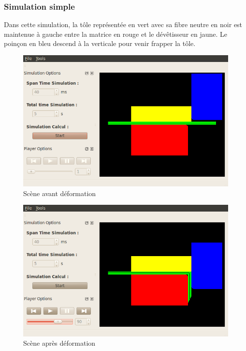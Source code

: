 \documentclass[a4paper, 11pt]{article}
\begin{document}
\subsubsection{Simulation simple}
Dans cette simulation, la tôle représentée en vert avec sa fibre neutre en noir est maintenue à gauche entre la matrice en rouge et le dévêtisseur en jaune.
Le poinçon en bleu descend à la verticale pour venir frapper la tôle.
\begin{figure}[H]
    \begin{center}
        \includegraphics[width=.8\textwidth]{img/fenetreInitiale.png}
    \end{center}
    \caption{Scène avant déformation}
\end{figure}
\begin{figure}[H]
    \begin{center}
        \includegraphics[width=.8\textwidth]{img/fenetreInitiale2.png}
    \end{center}
    \caption{Scène après déformation}
\end{figure}
\end{document}

